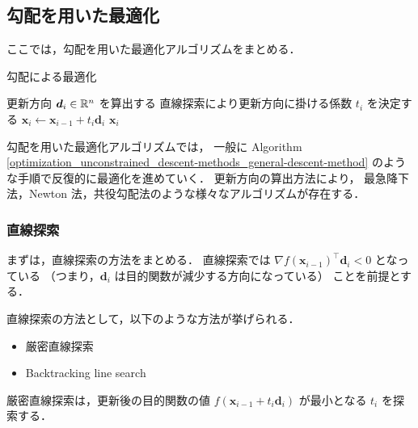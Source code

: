 %

\subsection{勾配を用いた最適化}

ここでは，勾配を用いた最適化アルゴリズムをまとめる．

\begin{algorithm}[tp]
    \caption{勾配による最適化}
    \label{optimization_unconstrained_descent-methods_general-descent-method}
    \begin{algorithmic}
                \State 更新方向 $\bm{d}_i \in \mathbb{R}^n$ を算出する
                \State 直線探索により更新方向に掛ける係数 $t_i$ を決定する
                \State $\bm{x}_i \gets \bm{x}_{i-1} + t_i \bm{d}_i$
                    \State \Return $\bm{x}_i$
                \EndIf
            \EndFor
        \EndProcedure
    \end{algorithmic}
\end{algorithm}

勾配を用いた最適化アルゴリズムでは，
一般に
Algorithm \ref{optimization_unconstrained_descent-methods_general-descent-method}
のような手順で反復的に最適化を進めていく．
更新方向の算出方法により，
最急降下法，Newton 法，共役勾配法のような様々なアルゴリズムが存在する．

\subsubsection{直線探索}

まずは，直線探索の方法をまとめる．
直線探索では
$\nabla f(\bm{x}_{i-1})^\top \bm{d}_i < 0$ となっている
（つまり，$\bm{d}_i$ は目的関数が減少する方向になっている）
ことを前提とする．

直線探索の方法として，以下のような方法が挙げられる．

\begin{itemize}
    \item 厳密直線探索
    \item Backtracking line search
\end{itemize}

厳密直線探索は，更新後の目的関数の値
$f(\bm{x}_{i-1} + t_i \bm{d}_i)$
が最小となる $t_i$ を探索する．

